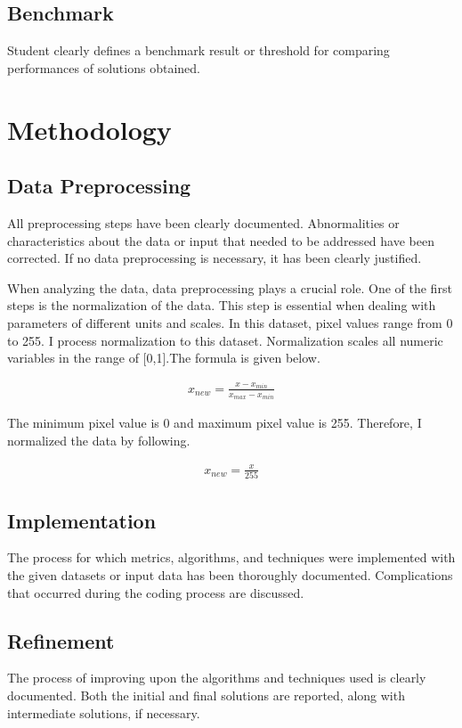 \documentclass[a4paper,10pt,fleqn]{article}
\begin{document}
\subsection{Benchmark}
Student clearly defines a benchmark result or threshold for comparing performances of solutions obtained.


\section{Methodology}
\subsection{Data Preprocessing}
All preprocessing steps have been clearly documented. Abnormalities or characteristics about the data or input that needed to be addressed have been corrected. If no data preprocessing is necessary, it has been clearly justified.

When analyzing the data, data preprocessing plays a crucial role. One of the first steps is the normalization of the data. This step is essential when dealing with parameters of different units and scales. In this dataset, pixel values range from 0 to 255. I process normalization to this dataset.
Normalization scales all numeric variables in the range of [0,1].The formula is given below.

\begin{eqnarray}
x_{new}=\frac{x-x_{min}}{x_{max}-x_{min}}
\end{eqnarray}

The minimum pixel value is 0 and maximum pixel value is 255. Therefore, I normalized the data by following.

\begin{eqnarray}
x_{new}=\frac{x}{255}
\end{eqnarray}

\subsection{Implementation}
The process for which metrics, algorithms, and techniques were implemented with the given datasets or input data has been thoroughly documented. Complications that occurred during the coding process are discussed.

\subsection{Refinement}
The process of improving upon the algorithms and techniques used is clearly documented. Both the initial and final solutions are reported, along with intermediate solutions, if necessary.
\end{document}
